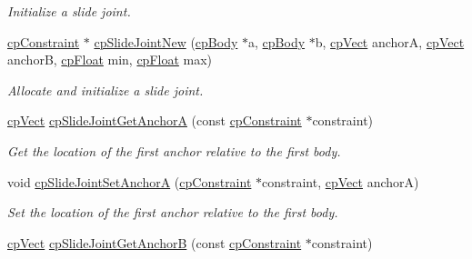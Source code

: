 \begin{DoxyCompactItemize}
\begin{DoxyCompactList}\small\item\em Initialize a slide joint. \end{DoxyCompactList}\item 
\hypertarget{group__cp_slide_joint_ga65b6191a0950a184fd5ba403c4769ba9}{}\hyperlink{structcp_constraint}{cp\+Constraint} $\ast$ \hyperlink{group__cp_slide_joint_ga65b6191a0950a184fd5ba403c4769ba9}{cp\+Slide\+Joint\+New} (\hyperlink{structcp_body}{cp\+Body} $\ast$a, \hyperlink{structcp_body}{cp\+Body} $\ast$b, \hyperlink{structcp_vect}{cp\+Vect} anchor\+A, \hyperlink{structcp_vect}{cp\+Vect} anchor\+B, \hyperlink{group__basic_types_gac1ed65573e035bf892505768c852d8d3}{cp\+Float} min, \hyperlink{group__basic_types_gac1ed65573e035bf892505768c852d8d3}{cp\+Float} max)\label{group__cp_slide_joint_ga65b6191a0950a184fd5ba403c4769ba9}

\begin{DoxyCompactList}\small\item\em Allocate and initialize a slide joint. \end{DoxyCompactList}\item 
\hypertarget{group__cp_slide_joint_gacac4c3f28d39e32d7b6fb6b441e599d4}{}\hyperlink{structcp_vect}{cp\+Vect} \hyperlink{group__cp_slide_joint_gacac4c3f28d39e32d7b6fb6b441e599d4}{cp\+Slide\+Joint\+Get\+Anchor\+A} (const \hyperlink{structcp_constraint}{cp\+Constraint} $\ast$constraint)\label{group__cp_slide_joint_gacac4c3f28d39e32d7b6fb6b441e599d4}

\begin{DoxyCompactList}\small\item\em Get the location of the first anchor relative to the first body. \end{DoxyCompactList}\item 
\hypertarget{group__cp_slide_joint_ga0bd7c1fd9b6e2bdb3d121c02fad07a50}{}void \hyperlink{group__cp_slide_joint_ga0bd7c1fd9b6e2bdb3d121c02fad07a50}{cp\+Slide\+Joint\+Set\+Anchor\+A} (\hyperlink{structcp_constraint}{cp\+Constraint} $\ast$constraint, \hyperlink{structcp_vect}{cp\+Vect} anchor\+A)\label{group__cp_slide_joint_ga0bd7c1fd9b6e2bdb3d121c02fad07a50}

\begin{DoxyCompactList}\small\item\em Set the location of the first anchor relative to the first body. \end{DoxyCompactList}\item 
\hypertarget{group__cp_slide_joint_ga96de5403af626e4fa9e20e8fcc186ba8}{}\hyperlink{structcp_vect}{cp\+Vect} \hyperlink{group__cp_slide_joint_ga96de5403af626e4fa9e20e8fcc186ba8}{cp\+Slide\+Joint\+Get\+Anchor\+B} (const \hyperlink{structcp_constraint}{cp\+Constraint} $\ast$constraint)\label{group__cp_slide_joint_ga96de5403af626e4fa9e20e8fcc186ba8}


\end{DoxyCompactItemize}
